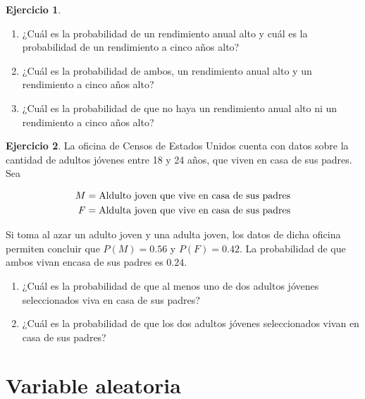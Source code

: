 \documentclass[
]{book}
\providecommand{\tightlist}{%
  \setlength{\itemsep}{0pt}\setlength{\parskip}{0pt}}
\theoremstyle{definition}
\theoremstyle{definition}
\theoremstyle{definition}
\newtheorem{exercise}{Ejercicio}[chapter]
\theoremstyle{definition}
\theoremstyle{remark}
\begin{document}
\begin{enumerate}
\begin{exercise}
  \begin{enumerate}
  \def\labelenumii{\alph{enumii}.}
  \tightlist
  \item
    ¿Cuál es la probabilidad de un rendimiento anual alto y cuál es la probabilidad de un rendimiento a cinco años alto?
  \item
    ¿Cuál es la probabilidad de ambos, un rendimiento anual alto y un rendimiento a cinco años alto?
  \item
    ¿Cuál es la probabilidad de que no haya un rendimiento anual alto ni un rendimiento a cinco años alto?
  \end{enumerate}

  \end{exercise}

  \begin{exercise}

  La oficina de Censos de Estados Unidos cuenta con datos sobre la cantidad de adultos jóvenes entre 18 y 24 años, que viven en casa de sus padres. Sea

  \begin{equation}
  \notag
  \begin{split}
  M &= \text{Aldulto joven que vive en casa de sus padres}\\
  F &= \text{Aldulta joven que vive en casa de sus padres}\\
  \end{split}
  \end{equation}

  Si toma al azar un adulto joven y una adulta joven, los datos de dicha oficina permiten concluir que \(P(M) = 0.56\) y \(P(F) = 0.42\). La probabilidad de que ambos vivan encasa de sus padres es \(0.24\).

  \begin{enumerate}
  \def\labelenumii{\alph{enumii}.}
  \tightlist
  \item
    ¿Cuál es la probabilidad de que al menos uno de dos adultos jóvenes seleccionados viva en casa de sus padres?
  \item
    ¿Cuál es la probabilidad de que los dos adultos jóvenes seleccionados vivan en casa de sus padres?
  \end{enumerate}

  \end{exercise}
\end{enumerate}

\hypertarget{variable-aleatoria}{%
\section{Variable aleatoria}\label{variable-aleatoria}}
\end{document}
